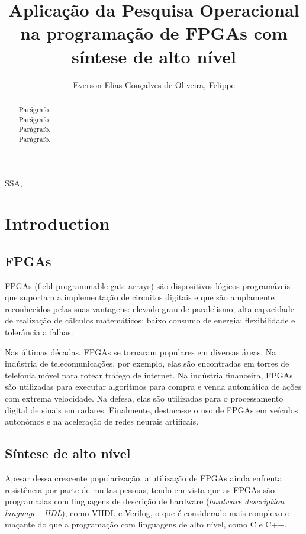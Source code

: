 \documentclass[journal]{IEEEtran}
\begin{document}
    \title{ Aplicação da Pesquisa Operacional na programação de FPGAs com síntese de alto nível }
    \nocite{*}
    \author{Everson Elias Gonçalves de Oliveira, Felippe} 
    
    \maketitle
    	
    \begin{abstract}
        Parágrafo.\\
        Parágrafo.\\
        Parágrafo.\\
        Parágrafo.
    \end{abstract}
    
    \begin{IEEEkeywords}
        SSA, 
    \end{IEEEkeywords}
    
    \section{Introduction}
        \subsection{FPGAs}
        FPGAs (field-programmable gate arrays) são dispositivos lógicos programáveis que suportam a implementação de circuitos digitais e que são amplamente reconhecidos pelas suas vantagens: elevado grau de paralelismo; alta capacidade de realização de cálculos matemáticos; baixo consumo de energia; flexibilidade e tolerância a falhas.
        
        Nas últimas décadas, FPGAs se tornaram populares em diversas áreas. Na indústria de telecomunicações, por exemplo, elas são encontradas em torres de telefonia móvel para rotear tráfego de internet. Na indústria financeira, FPGAs são utilizadas para executar algoritmos para compra e venda automática de ações com extrema velocidade. Na defesa, elas são utilizadas para o processamento digital de sinais em radares. Finalmente, destaca-se o uso de FPGAs em veículos autonômos e na aceleração de redes neurais artificais.

        \subsection{Síntese de alto nível}
        Apesar dessa crescente popularização, a utilização de FPGAs ainda enfrenta resistência por parte de muitas pessoas, tendo em vista que as FPGAs são programadas com linguagens de descrição de hardware (\textit{hardware description language} - \textit{HDL}), como VHDL e Verilog, o que é considerado mais complexo e maçante do que a programação com linguagens de alto nível, como C e C++.
        
\end{document}

